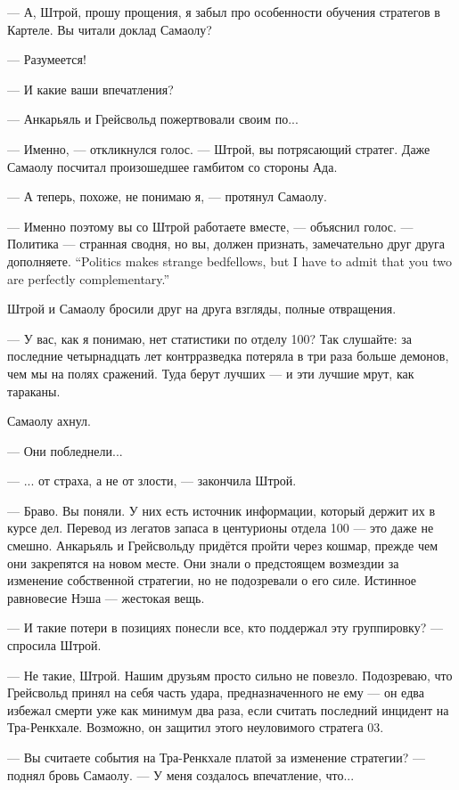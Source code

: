 --- А, Штрой, прошу прощения, я забыл про особенности обучения стратегов в Картеле.
Вы читали доклад Самаолу?

--- Разумеется!

--- И какие ваши впечатления?

--- Анкарьяль и Грейсвольд пожертвовали своим по...

--- Именно, --- откликнулся голос.
--- Штрой, вы потрясающий стратег.
Даже Самаолу посчитал произошедшее гамбитом со стороны Ада.

--- А теперь, похоже, не понимаю я, --- протянул Самаолу.

--- Именно поэтому вы со Штрой работаете вместе, --- объяснил голос.
{--- Политика --- странная сводня, но вы, должен признать, замечательно друг друга дополняете.}
{``Politics makes strange bedfellows, but I have to admit that you two are perfectly complementary.''}

Штрой и Самаолу бросили друг на друга взгляды, полные отвращения.

--- У вас, как я понимаю, нет статистики по отделу 100?
Так слушайте: за последние четырнадцать лет контрразведка потеряла в три раза больше демонов, чем мы на полях сражений.
Туда берут лучших --- и эти лучшие мрут, как тараканы.

Самаолу ахнул.

--- Они побледнели...

--- ... от страха, а не от злости, --- закончила Штрой.

--- Браво.
Вы поняли.
У них есть источник информации, который держит их в курсе дел.
Перевод из легатов запаса в центурионы отдела 100 --- это даже не смешно.
Анкарьяль и Грейсвольду придётся пройти через кошмар, прежде чем они закрепятся на новом месте.
Они знали о предстоящем возмездии за изменение собственной стратегии, но не подозревали о его силе.
Истинное равновесие Нэша --- жестокая вещь.

--- И такие потери в позициях понесли все, кто поддержал эту группировку? --- спросила Штрой.

--- Не такие, Штрой.
Нашим друзьям просто сильно не повезло.
Подозреваю, что Грейсвольд принял на себя часть удара, предназначенного не ему --- он едва избежал смерти уже как минимум два раза, если считать последний инцидент на Тра-Ренкхале.
Возможно, он защитил этого неуловимого стратега 03.

--- Вы считаете события на Тра-Ренкхале платой за изменение стратегии? --- поднял бровь Самаолу.
--- У меня создалось впечатление, что...

